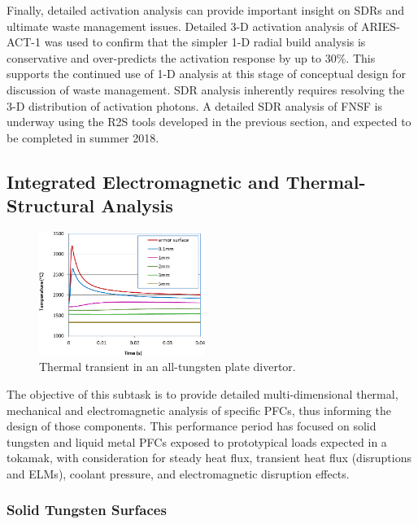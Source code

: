 Finally, detailed activation analysis can provide important insight on
\glspl{SDR} and ultimate waste management issues.  Detailed 3-D activation
analysis of ARIES-ACT-1 was used to confirm that the simpler 1-D radial build
analysis is conservative and over-predicts the activation response by up to
30\%.  This supports the continued use of 1-D analysis at this stage of
conceptual design for discussion of waste management.  \gls{SDR} analysis
inherently requires resolving the 3-D distribution of activation photons.  A
detailed \gls{SDR} analysis of FNSF is underway using the \gls{R2S} tools
developed in the previous section, and expected to be completed in summer
2018.

\subsection{Integrated Electromagnetic and Thermal-Structural Analysis}

\begin{figure}
\centering
\includegraphics[width=0.48\textwidth]{imgs/elm-thermal.png}
\caption{\label{fig:elm-thermal}Thermal transient in an all-tungsten plate divertor.}
\end{figure}

The objective of this subtask is to provide detailed multi-dimensional
thermal, mechanical and electromagnetic analysis of specific \glspl{PFC}, thus
informing the design of those components.  This performance period has focused
on solid tungsten and liquid metal \glspl{PFC} exposed to prototypical loads
expected in a tokamak, with consideration for steady heat flux, transient heat
flux (disruptions and \glspl{ELM}), coolant pressure, and electromagnetic
disruption effects.


\subsubsection{Solid Tungsten Surfaces}

